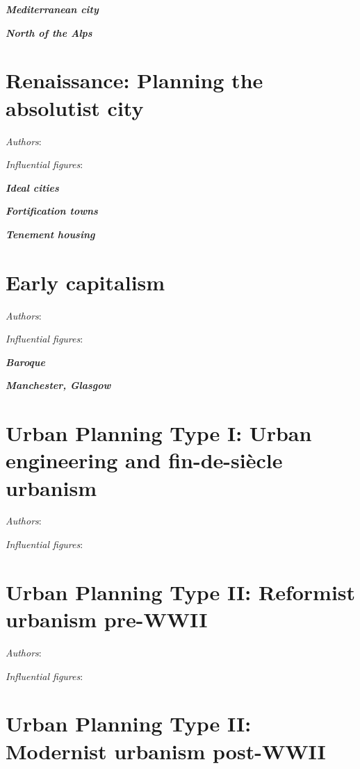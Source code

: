 \documentclass{article}
\newcommand{\bisection}[1]{\textbf{\textit{#1}}}
\begin{document}
\bisection{Mediterranean city}

\bisection{North of the Alps}

\section{Renaissance: Planning the absolutist city}

\textit{Authors}:

\textit{Influential figures}:

\bisection{Ideal cities}

\bisection{Fortification towns}


\bisection{Tenement housing}

\section{Early capitalism}

\textit{Authors}:

\textit{Influential figures}:

\bisection{Baroque}

\bisection{Manchester, Glasgow}

\section{Urban Planning Type I: Urban engineering and fin-de-siècle urbanism}

\textit{Authors}:

\textit{Influential figures}:

\bisection{}

\section{Urban Planning Type II: Reformist urbanism pre-WWII}

\textit{Authors}:

\textit{Influential figures}:

\section{Urban Planning Type II: Modernist urbanism post-WWII}
\end{document}

